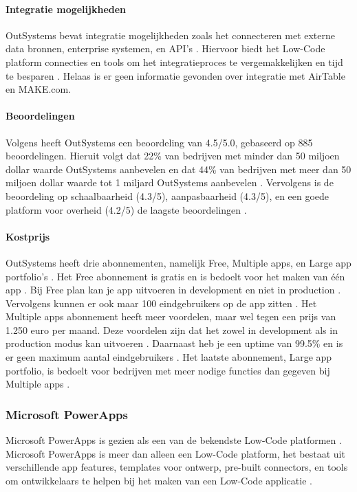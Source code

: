 \paragraph{Integratie mogelijkheden}
OutSystems bevat integratie mogelijkheden zoals het connecteren met externe data bronnen, enterprise systemen, en API's \autocite{Payne2023}.
Hiervoor biedt het Low-Code platform connecties en tools om het integratieproces te vergemakkelijken en tijd te besparen \autocite{Payne2023}. Helaas
is er geen informatie gevonden over integratie met AirTable en MAKE.com.

\paragraph{Beoordelingen}
Volgens \textcite{Gartner2024} heeft OutSystems een beoordeling van 4.5/5.0, gebaseerd op 885 beoordelingen. 
Hieruit volgt dat 22\% van bedrijven met minder dan 50 miljoen dollar waarde OutSystems aanbevelen en dat 44\% van bedrijven met meer dan 50 miljoen dollar waarde tot 1 miljard OutSystems aanbevelen \autocite{Gartner2024}.
Vervolgens is de beoordeling op schaalbaarheid (4.3/5), aanpasbaarheid (4.3/5), en een goede platform voor overheid (4.2/5) de laagste beoordelingen \autocite{Gartner2024}.

\paragraph{Kostprijs}
OutSystems heeft drie abonnementen, namelijk Free, Multiple apps, en Large app portfolio's \autocite{OutSystems}. Het Free abonnement is gratis en is bedoelt voor het maken van één app \autocite{OutSystems}.
Bij Free plan kan je app uitvoeren in development en niet in production \autocite{OutSystems}. Vervolgens kunnen er ook maar 100 eindgebruikers op de app zitten \autocite{OutSystems}.
Het Multiple apps abonnement heeft meer voordelen, maar wel tegen een prijs van 1.250 euro per maand. Deze voordelen zijn dat het zowel in development als in production modus kan uitvoeren \autocite{OutSystems}.
Daarnaast heb je een uptime van 99.5\% en is er geen maximum aantal eindgebruikers \autocite{OutSystems}. Het laatste abonnement, Large app portfolio, is bedoelt voor bedrijven met meer nodige functies dan gegeven bij Multiple apps \autocite{OutSystems}. 
\subsubsection*{Microsoft PowerApps}
Microsoft PowerApps is gezien als een van de bekendste Low-Code platformen \autocite{Nguyen} \autocite{Gupta2023}.
Microsoft PowerApps is meer dan alleen een Low-Code platform, het bestaat uit verschillende app features, templates voor ontwerp, pre-built connectors, en tools om ontwikkelaars te helpen bij het maken van een Low-Code applicatie \autocite{Nguyen}.

